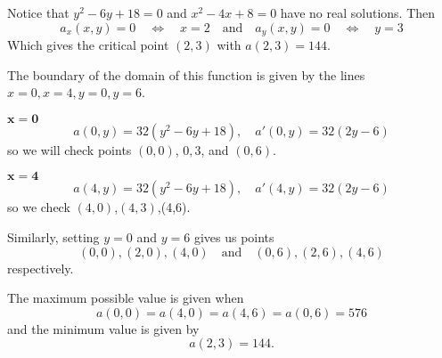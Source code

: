 \documentclass[12pt]{exam}
\newcommand{\bif}{\quad\iff\quad}
\begin{document}
\begin{questions}
\begin{solution}
                Notice that \(y^2-6y+18=0\) and \(x^2-4x+8=0\) have no real solutions. Then 
                \[
                    a_x(x,y)=0 \bif x=2 \quad\text{and}\quad a_y(x,y)=0 \bif y=3
                \]
                Which gives the critical point \((2,3)\) with \(a(2,3)=144\).

                The boundary of the domain of this function is given by the lines \(x=0,x=4,y=0,y=6\).

                \noindent \(\bm{x=0}\)\\
                \[
                    a(0,y) = 32(y^2-6y+18),\quad a'(0,y)=32(2y-6) 
                \] so we will check points \((0,0)\), \(0,3\), and \((0,6)\).

                \noindent \(\bm{x=4}\)\\
                \[
                    a(4,y) = 32(y^2-6y+18),\quad a'(4,y)=32(2y-6)
                \] 
                so we check \((4,0)\),\((4,3)\),(4,6).

                Similarly, setting \(y=0\) and \(y=6\) gives us points
                \[
                    (0,0), (2,0), (4,0)\quad \text{and}\quad (0,6), (2,6), (4,6)
                \]
                respectively. 

                The maximum possible value is given when 
                \[
                    a(0,0)=a(4,0)=a(4,6)=a(0,6)=576
                \] and the minimum value is given by 
                \[
                    a(2,3)=144.
                \]

        \end{solution}
    \else
        \vfill
    \fi 

\end{questions}
\end{document}
